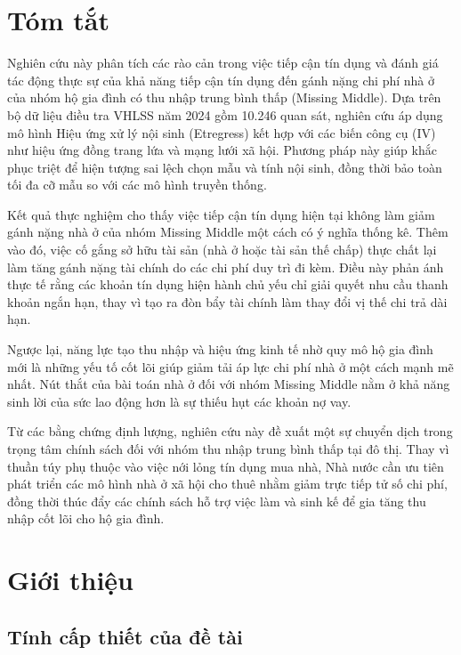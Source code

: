 \documentclass[12pt,a4paper]{report}
\begin{document}
	\chapter*{Tóm tắt}
	
	Nghiên cứu này phân tích các rào cản trong việc tiếp cận tín dụng và đánh giá tác động thực sự của khả năng tiếp cận tín dụng đến gánh nặng chi phí nhà ở của nhóm hộ gia đình có thu nhập trung bình thấp (Missing Middle). Dựa trên bộ dữ liệu điều tra VHLSS năm 2024 gồm 10.246 quan sát, nghiên cứu áp dụng mô hình Hiệu ứng xử lý nội sinh (Etregress) kết hợp với các biến công cụ (IV) như hiệu ứng đồng trang lứa và mạng lưới xã hội. Phương pháp này giúp khắc phục triệt để hiện tượng sai lệch chọn mẫu và tính nội sinh, đồng thời bảo toàn tối đa cỡ mẫu so với các mô hình truyền thống.
	
	Kết quả thực nghiệm cho thấy việc tiếp cận tín dụng hiện tại không làm giảm gánh nặng nhà ở của nhóm Missing Middle một cách có ý nghĩa thống kê. Thêm vào đó, việc cố gắng sở hữu tài sản (nhà ở hoặc tài sản thế chấp) thực chất lại làm tăng gánh nặng tài chính do các chi phí duy trì đi kèm. Điều này phản ánh thực tế rằng các khoản tín dụng hiện hành chủ yếu chỉ giải quyết nhu cầu thanh khoản ngắn hạn, thay vì tạo ra đòn bẩy tài chính làm thay đổi vị thế chi trả dài hạn.
	
	Ngược lại, năng lực tạo thu nhập và hiệu ứng kinh tế nhờ quy mô hộ gia đình mới là những yếu tố cốt lõi giúp giảm tải áp lực chi phí nhà ở một cách mạnh mẽ nhất. Nút thắt của bài toán nhà ở đối với nhóm Missing Middle nằm ở khả năng sinh lời của sức lao động hơn là sự thiếu hụt các khoản nợ vay.
	
	Từ các bằng chứng định lượng, nghiên cứu này đề xuất một sự chuyển dịch trong trọng tâm chính sách đối với nhóm thu nhập trung bình thấp tại đô thị. Thay vì thuần túy phụ thuộc vào việc nới lỏng tín dụng mua nhà, Nhà nước cần ưu tiên phát triển các mô hình nhà ở xã hội cho thuê nhằm giảm trực tiếp tử số chi phí, đồng thời thúc đẩy các chính sách hỗ trợ việc làm và sinh kế để gia tăng thu nhập cốt lõi cho hộ gia đình.
	
			
	\chapter{Giới thiệu}
	
	\section{Tính cấp thiết của đề tài}
	
\end{document}
